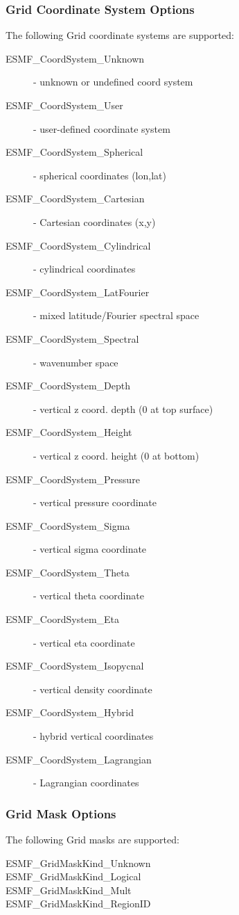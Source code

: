\subsubsection{Grid Coordinate System Options}
The following Grid coordinate systems are supported:
\begin{description}
   \item[ESMF\_CoordSystem\_Unknown] - unknown or undefined coord system
   \item[ESMF\_CoordSystem\_User] - user-defined coordinate system
   \item[ESMF\_CoordSystem\_Spherical] - spherical coordinates (lon,lat)
   \item[ESMF\_CoordSystem\_Cartesian] - Cartesian coordinates (x,y)
   \item[ESMF\_CoordSystem\_Cylindrical] - cylindrical coordinates
   \item[ESMF\_CoordSystem\_LatFourier] - mixed latitude/Fourier spectral space
   \item[ESMF\_CoordSystem\_Spectral] - wavenumber space
   \item[ESMF\_CoordSystem\_Depth] - vertical z coord. depth (0 at top surface)
   \item[ESMF\_CoordSystem\_Height] - vertical z coord. height (0 at bottom)
   \item[ESMF\_CoordSystem\_Pressure] - vertical pressure coordinate
   \item[ESMF\_CoordSystem\_Sigma] - vertical sigma coordinate
   \item[ESMF\_CoordSystem\_Theta] - vertical theta coordinate
   \item[ESMF\_CoordSystem\_Eta] - vertical eta coordinate
   \item[ESMF\_CoordSystem\_Isopycnal] - vertical density coordinate
   \item[ESMF\_CoordSystem\_Hybrid] - hybrid vertical coordinates
   \item[ESMF\_CoordSystem\_Lagrangian] - Lagrangian coordinates
\end{description}

\subsubsection{Grid Mask Options}
The following Grid masks are supported:
\begin{description}
   \item[ESMF\_GridMaskKind\_Unknown]
   \item[ESMF\_GridMaskKind\_Logical]
   \item[ESMF\_GridMaskKind\_Mult]
   \item[ESMF\_GridMaskKind\_RegionID]
\end{description}
